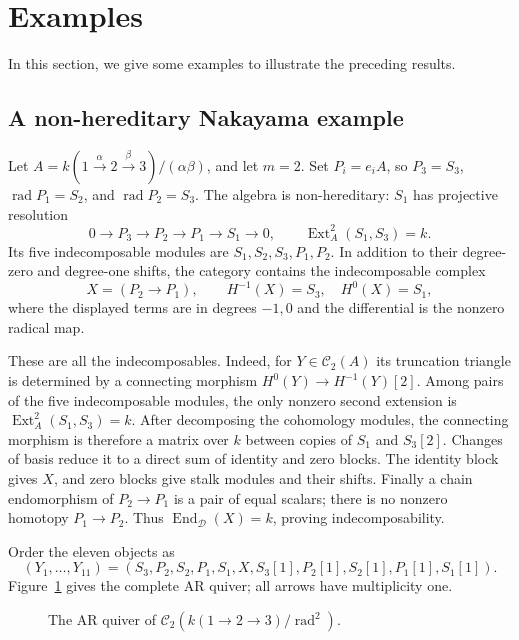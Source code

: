 \documentclass[pdflatex,sn-mathphys-num]{sn-jnl}
\numberwithin{equation}{section}
\theoremstyle{definition}
\theoremstyle{remark}\newtheorem{remark}[theorem]{Remark}
\newcommand{\C}{\mathcal C}
\newcommand{\D}{\mathcal D}
\newcommand{\End}{\operatorname{End}}
\newcommand{\Ext}{\operatorname{Ext}}
\newcommand{\rad}{\operatorname{rad}}
\begin{document}
\section{Examples}\label{sec:examples}
In this section, we give some examples to illustrate the preceding results.

\subsection{A non-hereditary Nakayama example}\label{sec:nakayama}
Let $A=k(1\xrightarrow\alpha2\xrightarrow\beta3)/(\alpha\beta)$,
and let $m=2$. Set $P_i=e_iA$, so $P_3=S_3$,
$\rad P_1=S_2$, and $\rad P_2=S_3$. The algebra is non-hereditary:
$S_1$ has projective resolution
\[
 0\longrightarrow P_3\longrightarrow P_2\longrightarrow P_1
 \longrightarrow S_1\longrightarrow0,
 \qquad \Ext_A^2(S_1,S_3)=k.
\]
Its five indecomposable modules are $S_1,S_2,S_3,P_1,P_2$.
In addition to their degree-zero and degree-one shifts, the category
contains the indecomposable complex
\[
 X=(P_2\longrightarrow P_1),\qquad
 H^{-1}(X)=S_3,\quad H^0(X)=S_1,
\]
where the displayed terms are in degrees $-1,0$ and the differential is
the nonzero radical map.

These are all the indecomposables. Indeed, for $Y\in\C_2(A)$ its
truncation triangle is determined by a connecting morphism
$H^0(Y)\to H^{-1}(Y)[2]$. Among pairs of the five indecomposable
modules, the only nonzero second extension is
$\Ext_A^2(S_1,S_3)=k$. After decomposing the cohomology modules, the
connecting morphism is therefore a matrix over $k$ between copies of
$S_1$ and $S_3[2]$. Changes of basis reduce it to a direct sum of identity
and zero blocks. The identity block gives $X$, and zero blocks give stalk
modules and their shifts. Finally a chain endomorphism of
$P_2\to P_1$ is a pair of equal scalars; there is no nonzero homotopy
$P_1\to P_2$. Thus $\End_{\D}(X)=k$, proving indecomposability.

Order the eleven objects as
\begin{equation}\label{eq:nakorder}
 (Y_1,\ldots,Y_{11})=
 (S_3,P_2,S_2,P_1,S_1,X,S_3[1],P_2[1],S_2[1],P_1[1],S_1[1]).
\end{equation}
Figure~\ref{fig:nakquiver} gives the complete AR quiver; all arrows have multiplicity one.
\begin{figure}[htbp]
\centering
{}
\caption{The AR quiver of $\C_2(k(1\to2\to3)/\rad^2)$.}\label{fig:nakquiver}
\end{figure}
\end{document}
